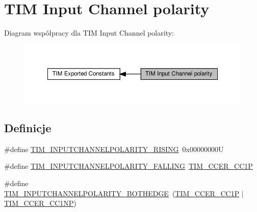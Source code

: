 \hypertarget{group___t_i_m___input___channel___polarity}{}\section{T\+IM Input Channel polarity}
\label{group___t_i_m___input___channel___polarity}
Diagram współpracy dla T\+IM Input Channel polarity\+:\nopagebreak
\begin{figure}[H]
\begin{center}
\leavevmode
\includegraphics[width=350pt]{group___t_i_m___input___channel___polarity}
\end{center}
\end{figure}
\subsection*{Definicje}
\begin{DoxyCompactItemize}
\item 
\#define \hyperlink{group___t_i_m___input___channel___polarity_ga4f4cede88a4ad4b33e81f2567e9bb08f}{T\+I\+M\+\_\+\+I\+N\+P\+U\+T\+C\+H\+A\+N\+N\+E\+L\+P\+O\+L\+A\+R\+I\+T\+Y\+\_\+\+R\+I\+S\+I\+NG}~0x00000000U
\item 
\#define \hyperlink{group___t_i_m___input___channel___polarity_ga07441a8c0a52234e30f471c23803450c}{T\+I\+M\+\_\+\+I\+N\+P\+U\+T\+C\+H\+A\+N\+N\+E\+L\+P\+O\+L\+A\+R\+I\+T\+Y\+\_\+\+F\+A\+L\+L\+I\+NG}~\hyperlink{group___peripheral___registers___bits___definition_ga0ca0aedba14241caff739afb3c3ee291}{T\+I\+M\+\_\+\+C\+C\+E\+R\+\_\+\+C\+C1P}
\item 
\#define \hyperlink{group___t_i_m___input___channel___polarity_gaab2598881d1f19158e77723c5d29d6ac}{T\+I\+M\+\_\+\+I\+N\+P\+U\+T\+C\+H\+A\+N\+N\+E\+L\+P\+O\+L\+A\+R\+I\+T\+Y\+\_\+\+B\+O\+T\+H\+E\+D\+GE}~(\hyperlink{group___peripheral___registers___bits___definition_ga0ca0aedba14241caff739afb3c3ee291}{T\+I\+M\+\_\+\+C\+C\+E\+R\+\_\+\+C\+C1P} $\vert$ \hyperlink{group___peripheral___registers___bits___definition_ga403fc501d4d8de6cabee6b07acb81a36}{T\+I\+M\+\_\+\+C\+C\+E\+R\+\_\+\+C\+C1\+NP})
\end{DoxyCompactItemize}


